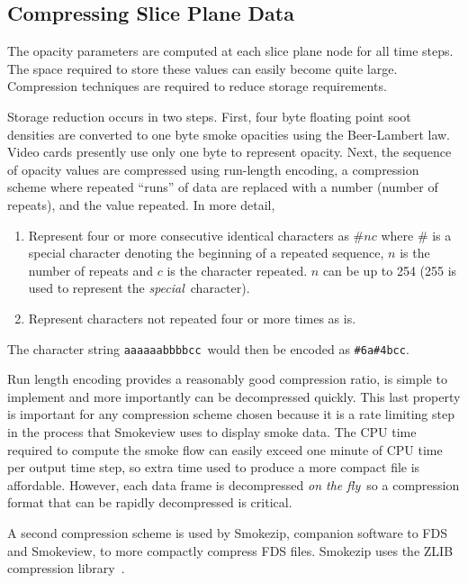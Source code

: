 {%

\subsection{Compressing Slice Plane Data}

The opacity parameters are computed at each slice plane node for
all time steps. The space required to store these values can
easily become quite large. Compression techniques are required to
reduce storage requirements.

Storage reduction occurs in two steps.  First, four byte floating
point soot densities are converted to one byte smoke opacities
using the Beer-Lambert law.  Video cards presently use only one
byte to represent opacity. Next, the sequence of opacity values
are compressed using run-length encoding, a compression scheme
where repeated ``runs'' of data are replaced with a number (number
of repeats), and the value repeated.  In more detail,


\begin{enumerate}
\item Represent four or more consecutive identical characters as
$\# n c$ where $\#$ is a special character denoting the beginning
of a repeated sequence, $n$ is the number of repeats and $c$ is
the character repeated.  $n$ can be up to 254 (255 is used to
represent the {\em special}\ character).
\item Represent
characters not repeated four or more times as is.
\end{enumerate}

The character string {\tt aaaaaabbbbcc}\ would then be encoded as
{\tt \#6a\#4bcc}.

Run length encoding provides a reasonably good compression ratio,
is simple to implement and more importantly can be decompressed
quickly. This last property is important for any compression
scheme chosen because it is a rate limiting step in the process
that Smokeview uses to display smoke data. The CPU time required
to compute the smoke flow can easily exceed one minute of CPU time
per output time step, so extra time used to produce a more compact
file is affordable. However, each data frame is decompressed {\em
on the fly}\ so a compression format that can be rapidly
decompressed is critical.

A second compression scheme is used by Smokezip, companion
software to FDS and Smokeview, to more compactly compress FDS
files.  Smokezip uses the ZLIB compression library~\cite{ZLIB}.

}
